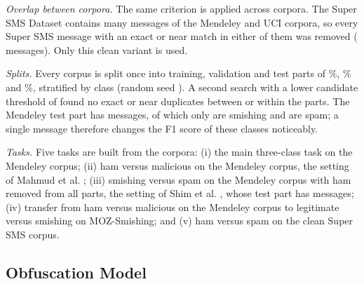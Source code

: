 \emph{Overlap between corpora.} The same criterion is applied across corpora. The Super SMS Dataset contains many messages of the Mendeley and UCI corpora, so every Super SMS message with an exact or near match in either of them was removed ( messages). Only this clean variant is used.

\emph{Splits.} Every corpus is split once into training, validation and test parts of \%, \% and \%, stratified by class (random seed ). A second search with a lower candidate threshold of  found no exact or near duplicates between or within the parts. The Mendeley test part has  messages, of which only  are smishing and  are spam; a single message therefore changes the F1 score of these classes noticeably.



\emph{Tasks.} Five tasks are built from the corpora: (i) the main three-class task on the Mendeley corpus; (ii) ham versus malicious on the Mendeley corpus, the setting of Mahmud et al. \cite{mahmud2024}; (iii) smishing versus spam on the Mendeley corpus with ham removed from all parts, the setting of Shim et al. \cite{shim2024}, whose test part has  messages; (iv) transfer from ham versus malicious on the Mendeley corpus to legitimate versus smishing on MOZ-Smishing; and (v) ham versus spam on the clean Super SMS corpus.

\subsection{Obfuscation Model}\label{sec:obfuscation}


